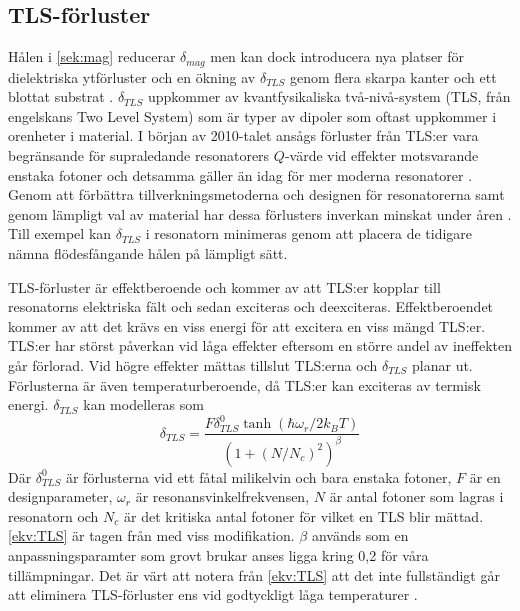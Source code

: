 \documentclass[main.tex]{subfiles}
\begin{document}

\subsection{TLS-förluster}
\label{sec:tls}
Hålen i \ref{sek:mag} reducerar $\delta_{mag}$ men kan dock introducera nya platser för dielektriska ytförluster och en ökning av $\delta_{TLS}$ genom flera skarpa kanter och ett blottat substrat \cite{Chiaro2016}. $\delta_{TLS}$ uppkommer av kvantfysikaliska två-nivå-system (TLS, från engelskans Two Level System) som är typer av dipoler som oftast uppkommer i orenheter i material. I början av 2010-talet ansågs förluster från TLS:er vara begränsande för supraledande resonatorers $Q$-värde vid effekter motsvarande enstaka fotoner \cite{Siddiqi2011} och detsamma gäller än idag för mer moderna resonatorer \cite{Boehme2016}\cite{Goetz2016}. Genom att förbättra tillverkningsmetoderna och designen för resonatorerna samt genom lämpligt val av material har dessa förlusters inverkan minskat under åren \cite{Oliver2013}. Till exempel kan $\delta_{TLS}$ i resonatorn minimeras genom att placera de tidigare nämna flödesfångande hålen på lämpligt sätt\cite{Chiaro2016}.

TLS-förluster är effektberoende och kommer av att TLS:er kopplar till resonatorns elektriska fält och sedan exciteras och deexciteras\cite{Boehme2016,Goetz2016}. 
Effektberoendet kommer av att det krävs en viss energi för att excitera en viss mängd TLS:er. TLS:er har störst påverkan vid låga effekter eftersom en större andel av ineffekten går förlorad. Vid högre effekter mättas tillslut TLS:erna och $\delta_{TLS}$ planar ut. Förlusterna är även temperaturberoende, då TLS:er kan exciteras av termisk energi.
$\delta_{TLS}$ kan modelleras som
\begin{equation}
    \delta_{TLS}=\frac{F\delta_{TLS}^0\tanh{(\hbar\omega_r/2k_BT)}}{(1+(N/N_c)^2)^\beta}
    \label{ekv:TLS}
\end{equation}
Där $\delta_{TLS}^0$ är förlusterna vid ett fåtal milikelvin och bara enstaka fotoner, $F$ är en designparameter, $\omega_r$ är resonansvinkelfrekvensen, $N$ är antal fotoner som lagras i resonatorn och $N_c$ är det kritiska antal fotoner för vilket en TLS blir mättad. \eqref{ekv:TLS} är tagen från \cite{pappas2011two} med viss modifikation. $\beta$ används som en anpassningsparamter som grovt brukar anses ligga kring 0,2 \cite{faoro2012} för våra tillämpningar. Det är värt att notera från \eqref{ekv:TLS} att det inte fullständigt går att eliminera TLS-förluster ens vid godtyckligt låga temperaturer \cite{Boehme2016}.
\end{document}
